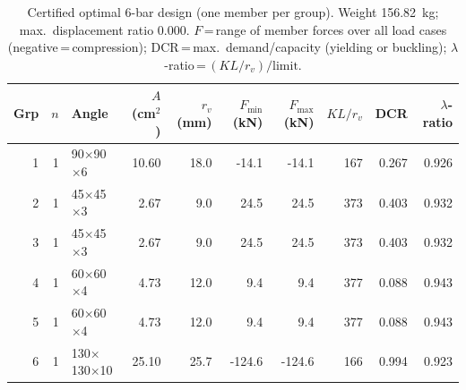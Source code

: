 \begin{table}[tbp]
\centering\footnotesize\setlength{\tabcolsep}{3pt}
\caption{Certified optimal 6-bar design (one member per group). Weight 156.82~kg; max.\ displacement ratio 0.000.
$F$\,=\,range of member forces over all load cases (negative\,=\,compression);
DCR\,=\,max.\ demand/capacity (yielding or buckling); $\lambda$-ratio\,=\,$(KL/r_v)/\text{limit}$.}
\label{tab:design6bar}
\begin{tabular}{@{}rrlrrrrrrr@{}}
\toprule
Grp & $n$ & Angle & $A$ (cm$^2$) & $r_v$ (mm) & $F_{\min}$ (kN) & $F_{\max}$ (kN) & $KL/r_v$ & DCR & $\lambda$-ratio\\
\midrule
1 & 1 & 90$\times$90$\times$6 & 10.60 & 18.0 & -14.1 & -14.1 & 167 & 0.267 & 0.926\\
2 & 1 & 45$\times$45$\times$3 & 2.67 & 9.0 & 24.5 & 24.5 & 373 & 0.403 & 0.932\\
3 & 1 & 45$\times$45$\times$3 & 2.67 & 9.0 & 24.5 & 24.5 & 373 & 0.403 & 0.932\\
4 & 1 & 60$\times$60$\times$4 & 4.73 & 12.0 & 9.4 & 9.4 & 377 & 0.088 & 0.943\\
5 & 1 & 60$\times$60$\times$4 & 4.73 & 12.0 & 9.4 & 9.4 & 377 & 0.088 & 0.943\\
6 & 1 & 130$\times$130$\times$10 & 25.10 & 25.7 & -124.6 & -124.6 & 166 & 0.994 & 0.923\\
\bottomrule
\end{tabular}
\end{table}
